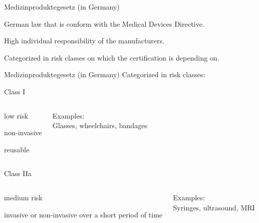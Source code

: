 \begin{frame}{Medizinproduktegesetz (in Germany)}
	\begin{beameritemize}
		\item German law that is conform with the Medical Devices Directive.
		\item High individual responsibility of the manufacturers. 
		\item Categorized in risk classes on which the certification is depending on.
	\end{beameritemize}	
\end{frame}

\begin{frame}{Medizinproduktegesetz (in Germany)}
	Categorized in risk classes:	
	\begin{block}{Class I}
		\begin{columns}[c]
			\column{2in}
			\begin{beameritemize}
				\item low risk
				\item non-invasive
				\item reusable
			\end{beameritemize}			
			\column{2in}
			Examples:\\
			Glasses, wheelchairs, bandages
		\end{columns}		
	\end{block}
	
	\begin{block}{Class IIa}
		\begin{columns}[c]
			\column{2in}
			\begin{beameritemize}
			\item medium risk
			\item invasive or non-invasive over a short period of time
		\end{beameritemize}		
			\column{2in}
			Examples:\\
			Syringes, ultrasound, MRI
		\end{columns}		
	\end{block}
\end{frame}


